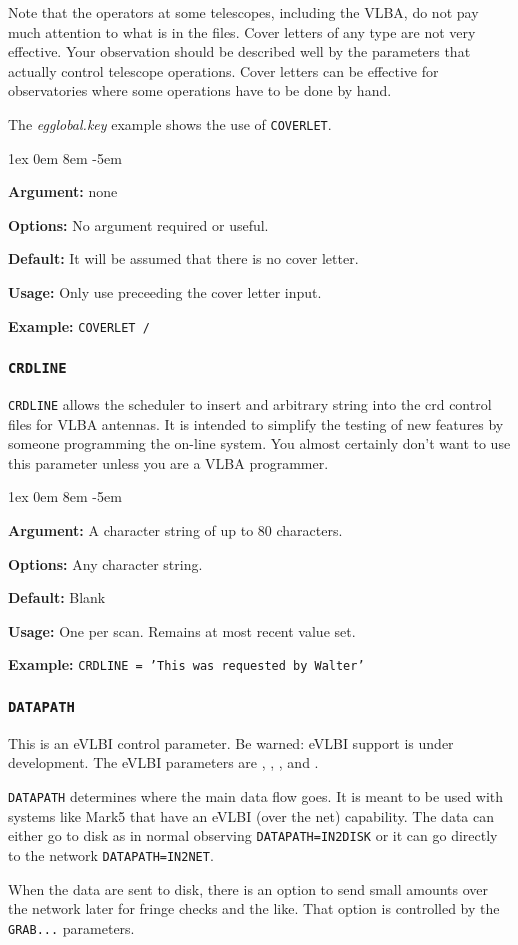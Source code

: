 \documentclass{report}
\newcommand{\rcwbox}[5]{
  \begin{list}{}{\parsep 1ex  \itemsep 0em
                 \leftmargin 8em  \itemindent -5em }
    \item {\bf Argument:} #1
    \item {\bf Options:}  #2
    \item {\bf Default:}  #3
    \item {\bf Usage:}    #4
    \item {\bf Example:}  #5
  \end{list}
}
\begin{document}
Note that the operators at some telescopes, including the VLBA, do
not pay much attention to what is in the files.  Cover letters
of any type are not very effective.  Your observation should be
described well by the parameters that actually control telescope
operations.  Cover letters can be effective for observatories where
some operations have to be done by hand.

The {\sl egglobal.key} example shows the use of {\tt COVERLET}.

\rcwbox
{none}
{No argument required or useful.}
{It will be assumed that there is no cover letter.}
{Only use preceeding the cover letter input.}
{{\tt COVERLET /}}

\subsubsection{\label{MP:CRDLINE}{\tt CRDLINE}}

{\tt CRDLINE} allows the scheduler to insert and arbitrary string
into the crd control files for VLBA antennas.  It is intended to
simplify the testing of new features by someone programming the
on-line system.  You almost certainly don't want to use this parameter
unless you are a VLBA programmer.

\rcwbox
{A character string of up to 80 characters.}
{Any character string.}
{Blank}
{One per scan.  Remains at most recent value set.}
{{\tt CRDLINE = 'This was requested by Walter'}}

\subsubsection{\label{MP:DATAPATH}{\tt DATAPATH}}

This is an eVLBI control parameter.  Be warned: eVLBI support is
under development.
The eVLBI parameters are ,
, ,
and .

{\tt DATAPATH} determines where the main data flow goes.  It is meant to
be used with systems like Mark5 that have an eVLBI (over the net)
capability.  The data can either go to disk as in normal observing
{\tt DATAPATH=IN2DISK} or it can go directly to the network
{\tt DATAPATH=IN2NET}.

When the data are sent to disk, there is an option to send small amounts
over the network later for fringe checks and the like.  That option is
controlled by the {\tt GRAB...} parameters.
\end{document}
